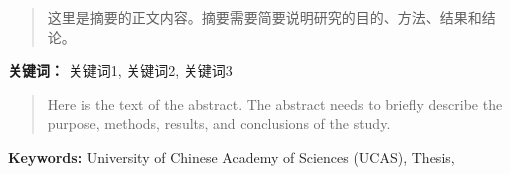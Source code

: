\maketitle%
\newpage



\renewcommand{\abstractname}{\bfseries\zihao{4}摘 \quad 要}


\begin{abstract}
    \thispagestyle{abstractpage}
    这里是摘要的正文内容。摘要需要简要说明研究的目的、方法、结果和结论。
\end{abstract}
\noindent \textbf{关键词：} 关键词1, 关键词2, 关键词3


\newpage
\thispagestyle{empty}
\mbox{}
\newpage

\renewcommand{\abstractname}{\bfseries\zihao{4} Abstract}


\begin{abstract}
    \thispagestyle{abstractpage}
    Here is the text of the abstract. The abstract needs to briefly describe the purpose, methods, results, and conclusions of the study.
\end{abstract}
\noindent \textbf{Keywords:} University of Chinese Academy of Sciences (UCAS), Thesis,


\newpage
\thispagestyle{empty}
\mbox{}
\newpage


\tableofcontents%
\thispagestyle{tocpage}
\newpage


\newpage
\thispagestyle{empty}
\mbox{}


